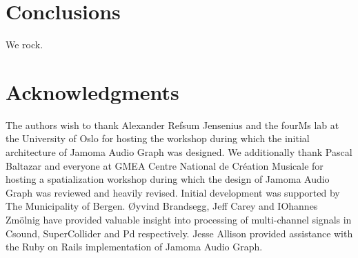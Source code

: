 \documentclass[twoside,a4paper]{article}
\begin{document}




%
\section{Conclusions} %
%

We rock.







%
%



%
\section{Acknowledgments} %
%

The authors wish to thank Alexander Refsum Jensenius and the fourMs lab at the University of Oslo for hosting the workshop during which the initial architecture of Jamoma Audio Graph was designed. %
We additionally thank Pascal Baltazar and everyone at GMEA Centre National de Cr\' eation Musicale for hosting a spatialization workshop during which the design of Jamoma Audio Graph was reviewed and heavily revised. %
Initial development was supported by The Municipality of Bergen.  
\O yvind Brandsegg, Jeff Carey and IOhannes Zm\"olnig have provided valuable insight into processing of multi-channel signals in Csound, SuperCollider and Pd respectively.
Jesse Allison provided assistance with the Ruby on Rails implementation of Jamoma Audio Graph.





\end{document}
